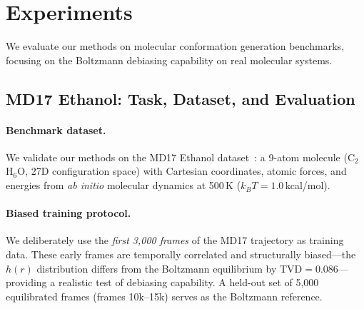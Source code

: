 \documentclass[11pt]{article}
\newcommand{\kBT}{k_BT}
\begin{document}
\section{Experiments}
\label{sec:experiments}

We evaluate our methods on molecular conformation generation benchmarks, focusing on the Boltzmann debiasing capability on real molecular systems.

\subsection{MD17 Ethanol: Task, Dataset, and Evaluation}
\label{sec:md17}

\paragraph{Benchmark dataset.}
We validate our methods on the MD17 Ethanol dataset~\citep{chmiela2017machine}: a 9-atom molecule (C$_2$H$_6$O, 27D configuration space) with Cartesian coordinates, atomic forces, and energies from \emph{ab initio} molecular dynamics at 500\,K ($\kBT = 1.0$\,kcal/mol).

\paragraph{Biased training protocol.}
We deliberately use the \emph{first 3{,}000 frames} of the MD17 trajectory as training data.
These early frames are temporally correlated and structurally biased---the $h(r)$ distribution differs from the Boltzmann equilibrium by TVD${}=0.086$---providing a realistic test of debiasing capability.
A held-out set of 5{,}000 equilibrated frames (frames 10k--15k) serves as the Boltzmann reference.
\end{document}
